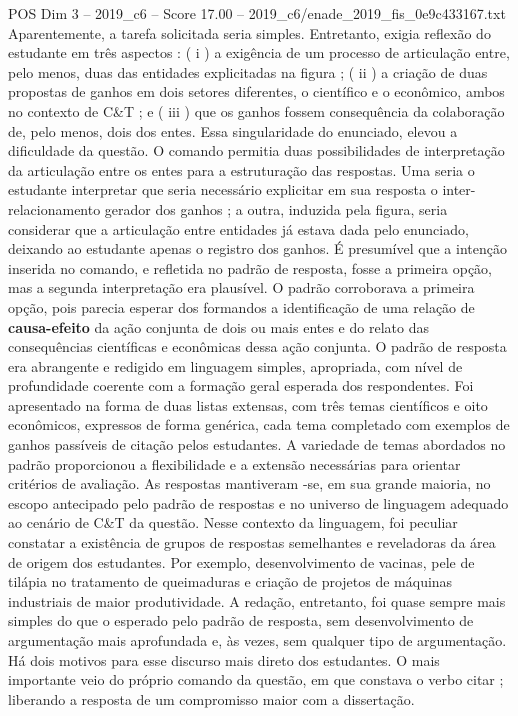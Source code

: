\begin{textsample}{POS Dim 3 – 2019\_c6 – Score 17.00 – 2019\_c6/enade\_2019\_fis\_0e9c433167.txt}
Aparentemente, a tarefa solicitada seria simples.
Entretanto, exigia reflexão do estudante em três aspectos : ( i ) a exigência de um processo de articulação entre, pelo menos, duas das entidades explicitadas na figura ; ( ii ) a criação de duas propostas de ganhos em dois setores diferentes, o científico e o econômico, ambos no contexto de C\&T ; e ( iii ) que os ganhos fossem consequência da colaboração de, pelo menos, dois dos entes.
Essa singularidade do enunciado, elevou a dificuldade da questão.
O comando permitia duas possibilidades de interpretação da articulação entre os entes para a estruturação das respostas.
Uma seria o estudante interpretar que seria necessário explicitar em sua resposta o inter-relacionamento gerador dos ganhos ; a outra, induzida pela figura, seria considerar que a articulação entre entidades já estava dada pelo enunciado, deixando ao estudante apenas o registro dos ganhos.
É presumível que a intenção inserida no comando, e refletida no padrão de resposta, fosse a primeira opção, mas a segunda interpretação era plausível.
O padrão corroborava a primeira opção, pois parecia esperar dos formandos a identificação de uma relação de \textbf{causa-efeito} da ação conjunta de dois ou mais entes e do relato das consequências científicas e econômicas dessa ação conjunta.
O padrão de resposta era abrangente e redigido em linguagem simples, apropriada, com nível de profundidade coerente com a formação geral esperada dos respondentes.
Foi apresentado na forma de duas listas extensas, com três temas científicos e oito econômicos, expressos de forma genérica, cada tema completado com exemplos de ganhos passíveis de citação pelos estudantes.
A variedade de temas abordados no padrão proporcionou a flexibilidade e a extensão necessárias para orientar critérios de avaliação.
As respostas mantiveram -se, em sua grande maioria, no escopo antecipado pelo padrão de respostas e no universo de linguagem adequado ao cenário de C\&T da questão.
Nesse contexto da linguagem, foi peculiar constatar a existência de grupos de respostas semelhantes e reveladoras da área de origem dos estudantes.
Por exemplo, desenvolvimento de vacinas, pele de tilápia no tratamento de queimaduras e criação de projetos de máquinas industriais de maior produtividade.
A redação, entretanto, foi quase sempre mais simples do que o esperado pelo padrão de resposta, sem desenvolvimento de argumentação mais aprofundada e, às vezes, sem qualquer tipo de argumentação.
Há dois motivos para esse discurso mais direto dos estudantes.
O mais importante veio do próprio comando da questão, em que constava o verbo citar ; liberando a resposta de um compromisso maior com a dissertação.

\end{textsample}
